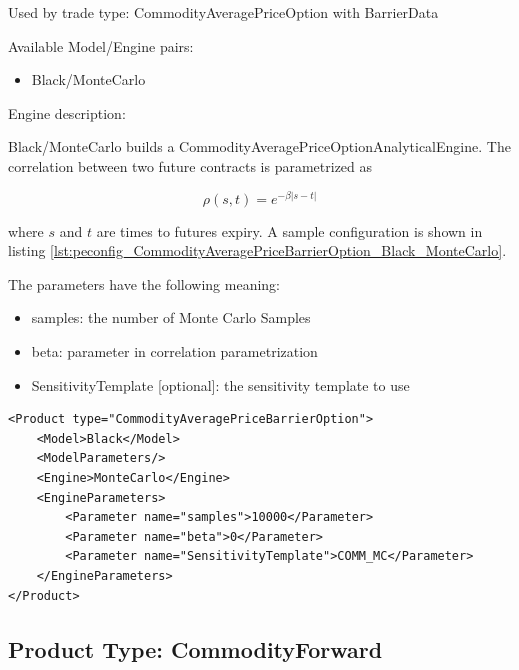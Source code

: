 Used by trade type: CommodityAveragePriceOption with BarrierData

Available Model/Engine pairs:

\begin{itemize}
\item Black/MonteCarlo
\end{itemize}

Engine description:

Black/MonteCarlo builds a CommodityAveragePriceOptionAnalyticalEngine. The correlation between two future contracts is
parametrized as

$$\rho(s, t) = e^{-\beta |s-t|}$$

where $s$ and $t$ are times to futures expiry. A sample configuration is shown in listing
\ref{lst:peconfig_CommodityAveragePriceBarrierOption_Black_MonteCarlo}.

The parameters have the following meaning:

\begin{itemize}
\item samples: the number of Monte Carlo Samples
\item beta: parameter in correlation parametrization
\item SensitivityTemplate [optional]: the sensitivity template to use
\end{itemize}

\begin{longlisting}
\begin{verbatim}
<Product type="CommodityAveragePriceBarrierOption">
    <Model>Black</Model>
    <ModelParameters/>
    <Engine>MonteCarlo</Engine>
    <EngineParameters>
        <Parameter name="samples">10000</Parameter>
        <Parameter name="beta">0</Parameter>
        <Parameter name="SensitivityTemplate">COMM_MC</Parameter>
    </EngineParameters>
</Product>
\end{verbatim}
\caption{Configuration for Product CommodityAveragePriceBarrierOption, Model Black, Engine MonteCarlo}
\label{lst:peconfig_CommodityAveragePriceBarrierOption_Black_MonteCarlo}
\end{longlisting}

\subsection{Product Type: CommodityForward}

